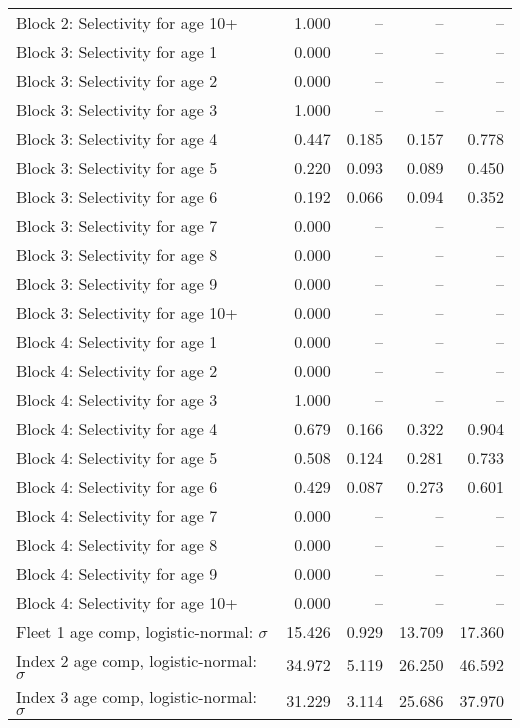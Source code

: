 \documentclass[
]{article}
\begin{document}
\begin{landscape}
\begin{longtable}[t]{lrrrr}
Block 2: Selectivity for age 10+ & 1.000 & -- & -- & --\\
Block 3: Selectivity for age 1 & 0.000 & -- & -- & --\\
Block 3: Selectivity for age 2 & 0.000 & -- & -- & --\\
Block 3: Selectivity for age 3 & 1.000 & -- & -- & --\\
\addlinespace
Block 3: Selectivity for age 4 & 0.447 & 0.185 & 0.157 & 0.778\\
Block 3: Selectivity for age 5 & 0.220 & 0.093 & 0.089 & 0.450\\
Block 3: Selectivity for age 6 & 0.192 & 0.066 & 0.094 & 0.352\\
Block 3: Selectivity for age 7 & 0.000 & -- & -- & --\\
Block 3: Selectivity for age 8 & 0.000 & -- & -- & --\\
\addlinespace
Block 3: Selectivity for age 9 & 0.000 & -- & -- & --\\
Block 3: Selectivity for age 10+ & 0.000 & -- & -- & --\\
Block 4: Selectivity for age 1 & 0.000 & -- & -- & --\\
Block 4: Selectivity for age 2 & 0.000 & -- & -- & --\\
Block 4: Selectivity for age 3 & 1.000 & -- & -- & --\\
\addlinespace
Block 4: Selectivity for age 4 & 0.679 & 0.166 & 0.322 & 0.904\\
Block 4: Selectivity for age 5 & 0.508 & 0.124 & 0.281 & 0.733\\
Block 4: Selectivity for age 6 & 0.429 & 0.087 & 0.273 & 0.601\\
Block 4: Selectivity for age 7 & 0.000 & -- & -- & --\\
Block 4: Selectivity for age 8 & 0.000 & -- & -- & --\\
\addlinespace
Block 4: Selectivity for age 9 & 0.000 & -- & -- & --\\
Block 4: Selectivity for age 10+ & 0.000 & -- & -- & --\\
Fleet 1 age comp, logistic-normal: $\sigma$ & 15.426 & 0.929 & 13.709 & 17.360\\
Index 2 age comp, logistic-normal: $\sigma$ & 34.972 & 5.119 & 26.250 & 46.592\\
Index 3 age comp, logistic-normal: $\sigma$ & 31.229 & 3.114 & 25.686 & 37.970\\*
\end{longtable}
\end{landscape}
\end{document}
